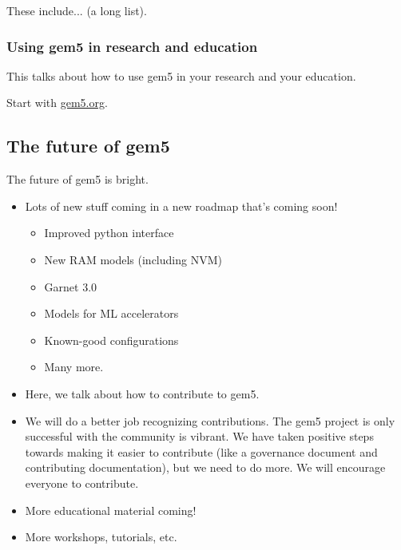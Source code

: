 These include... (a long list).

\subsubsection{Using gem5 in research and education}

This talks about how to use gem5 in your research and your education.

Start with \url{gem5.org}.

\subsection{The future of gem5}

The future of gem5 is bright.

\begin{itemize}
    \item Lots of new stuff coming in a new roadmap that's coming soon!
    \begin{itemize}
        \item Improved python interface
        \item New RAM models (including NVM)
        \item Garnet 3.0
        \item Models for ML accelerators
        \item Known-good configurations
        \item Many more.
    \end{itemize}
    \item Here, we talk about how to contribute to gem5.
    \item We will do a better job recognizing contributions. The gem5 project is only successful with the community is vibrant. We have taken positive steps towards making it easier to contribute (like a governance document and contributing documentation), but we need to do more. We will encourage everyone to contribute.
    \item More educational material coming!
    \item More workshops, tutorials, etc.
\end{itemize}
